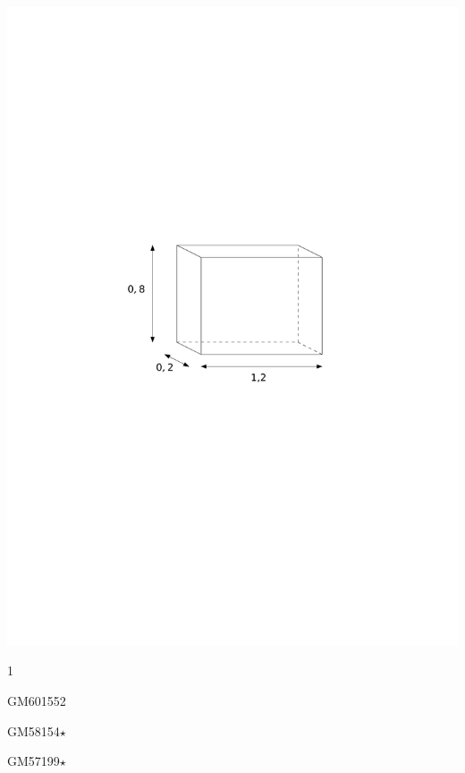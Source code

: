 \documentclass[a4paper,11pt]{report}
\begin{document}
\begin{exo}
{\begin{tasks}
    \task ~\\ \includegraphics[scale=0.5]{media/gm-02/pave4.pdf}
\end{tasks}
}{1}
\end{exo}



\begin{exol}{GM60}{155}{2}
\end{exol}


\begin{exol}{GM58}{154}{$\star$}
\end{exol}

\begin{exof}{GM57}{199}{$\star$}
\end{exof}
\end{document}
